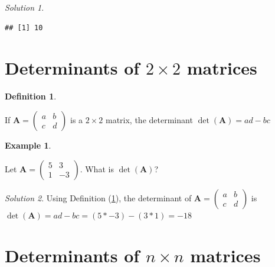 \documentclass[
]{book}
\theoremstyle{definition}
\newtheorem{definition}{Definition}[chapter]
\theoremstyle{definition}
\newtheorem{example}{Example}[chapter]
\theoremstyle{definition}
\theoremstyle{remark}
\newtheorem*{solution}{Solution}
\begin{document}
\begin{solution}
\begin{verbatim}
## [1] 10
\end{verbatim}

\end{solution}

\hypertarget{determinants-of-2-times-2-matrices}{%
\section{\texorpdfstring{Determinants of \(2 \times 2\) matrices}{Determinants of 2 \textbackslash times 2 matrices}}\label{determinants-of-2-times-2-matrices}}

\begin{definition}
\protect\hypertarget{def:det22}{}\label{def:det22}

If \(\mathbf{A} = \begin{pmatrix} a & b \\ c & d \end{pmatrix}\) is a \(2 \times 2\) matrix, the determinant \(\operatorname{det}(\mathbf{A}) = ad - bc\)

\end{definition}

\begin{example}
\protect\hypertarget{exm:unlabeled-div-101}{}\label{exm:unlabeled-div-101}

Let \(\mathbf{A} = \begin{pmatrix} 5 & 3 \\ 1 & -3 \end{pmatrix}\). What is \(\det(\mathbf{A})\)?

\end{example}

\begin{solution}

Using Definition (\ref{def:det22}), the determinant of \(\mathbf{A} = \begin{pmatrix} a & b \\ c & d \end{pmatrix}\) is \(\det(\mathbf{A}) = ad - bc= (5 * -3) - (3 * 1) = -18\)

\end{solution}

\hypertarget{determinants-of-n-times-n-matrices}{%
\section{\texorpdfstring{Determinants of \(n \times n\) matrices}{Determinants of n \textbackslash times n matrices}}\label{determinants-of-n-times-n-matrices}}
\end{document}
